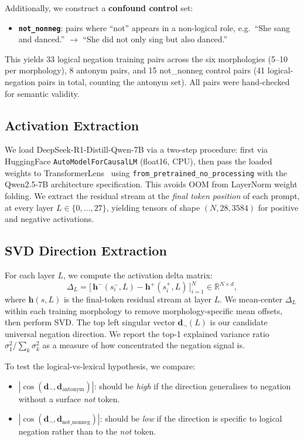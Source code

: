 \documentclass{article}
\begin{document}
Additionally, we construct a \textbf{confound control} set:
\begin{itemize}
  \item \textbf{\texttt{not\_nonneg}}: pairs where ``not'' appears in a non-logical role, e.g.\ ``She sang and danced.'' $\to$ ``She did not only sing but also danced.''
\end{itemize}

This yields 33 logical negation training pairs across the six morphologies (5--10 per morphology), 8 antonym pairs, and 15 not\_nonneg control pairs (41 logical-negation pairs in total, counting the antonym set).
All pairs were hand-checked for semantic validity.

\subsection{Activation Extraction}
\label{sec:activation}

We load DeepSeek-R1-Distill-Qwen-7B via a two-step procedure: first via HuggingFace \texttt{AutoModelForCausalLM} (float16, CPU), then pass the loaded weights to TransformerLens~\citep{nanda2022transformerlens} using \texttt{from\_pretrained\_no\_processing} with the Qwen2.5-7B architecture specification.
This avoids OOM from LayerNorm weight folding.
We extract the residual stream at the \emph{final token position} of each prompt, at every layer $L \in \{0,\ldots,27\}$, yielding tensors of shape $(N, 28, 3584)$ for positive and negative activations.

\subsection{SVD Direction Extraction}
\label{sec:svd}

For each layer $L$, we compute the activation delta matrix:
\[
  \Delta_L = \bigl[\,\mathbf{h}^-(s^-_i, L) - \mathbf{h}^+(s^+_i, L)\,\bigr]_{i=1}^{N}
  \in \mathbb{R}^{N \times d},
\]
where $\mathbf{h}(s, L)$ is the final-token residual stream at layer $L$.
We mean-center $\Delta_L$ within each training morphology to remove morphology-specific mean offsets, then perform SVD.
The top left singular vector $\mathbf{d}_{\neg}(L)$ is our candidate universal negation direction.
We report the top-1 explained variance ratio $\sigma_1^2 / \sum_k \sigma_k^2$ as a measure of how concentrated the negation signal is.

To test the logical-vs-lexical hypothesis, we compare:
\begin{itemize}
  \item $|\cos(\mathbf{d}_{\neg}, \mathbf{d}_{\text{antonym}})|$: should be \emph{high} if the direction generalises to negation without a surface \textit{not} token.
  \item $|\cos(\mathbf{d}_{\neg}, \mathbf{d}_{\text{not\_nonneg}})|$: should be \emph{low} if the direction is specific to logical negation rather than to the \textit{not} token.
\end{itemize}
\end{document}
